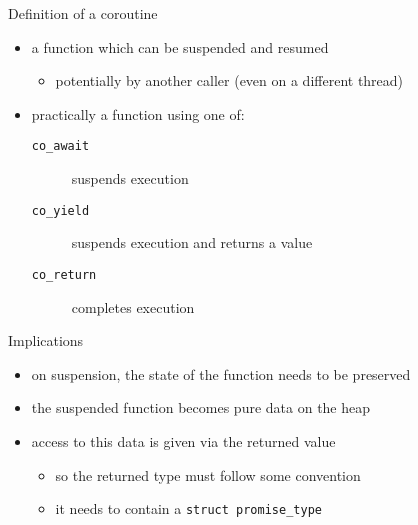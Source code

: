 \begin{frame}
  \begin{block}{Definition of a coroutine}
    \begin{itemize}
    \item a function which can be suspended and resumed
      \begin{itemize}
      \item potentially by another caller (even on a different thread)
      \end{itemize}
    \item practically a function using one of:
      \begin{description}
      \item[\texttt{co_await}] suspends execution
      \item[\texttt{co_yield}] suspends execution and returns a value
      \item[\texttt{co_return}] completes execution
      \end{description}
    \end{itemize}
  \end{block}
  \begin{alertblock}{Implications}
    \begin{itemize}
    \item on suspension, the state of the function needs to be preserved
    \item the suspended function becomes pure data on the heap
    \item access to this data is given via the returned value
      \begin{itemize}
      \item so the returned type must follow some convention
      \item it needs to contain a \texttt{struct promise_type}
      \end{itemize}
    \end{itemize}
  \end{alertblock}
\end{frame}

